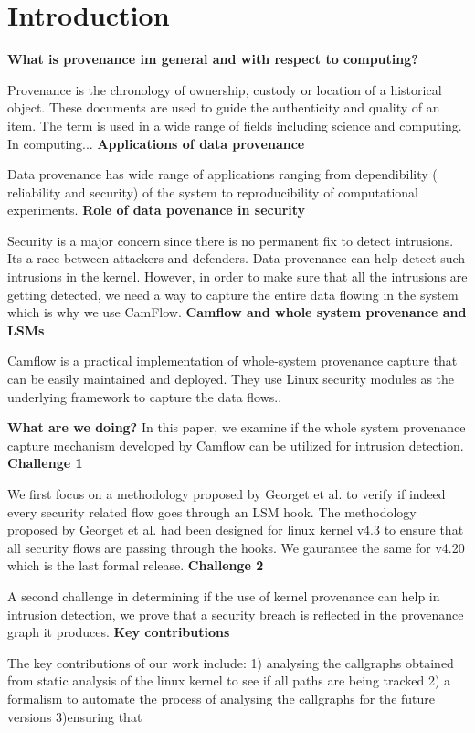 \section{Introduction}
\textbf{What is provenance im general and with respect to computing?}

Provenance is the chronology of ownership, custody or location of a historical object. These documents are used to guide the authenticity and quality of an item. The term is used in a wide range of fields including science and computing. In computing...
\vskip 0.1in
\textbf{Applications of data provenance}

Data provenance has wide range of applications ranging from dependibility ( reliability and security) of the system to reproducibility of computational experiments.
\vskip 0.1in
\textbf{Role of data povenance in security}

Security is a major concern since there is no permanent fix to detect intrusions. Its a race between attackers and defenders. Data provenance can help detect such intrusions in the kernel. However, in order to make sure that all the intrusions are getting detected, we need a way to capture the entire data flowing in the system which is why we use CamFlow. 
\vskip 0.1in
\textbf{Camflow and whole system provenance and LSMs}

Camflow is a practical implementation of whole-system provenance capture that can be easily maintained and deployed. They use Linux security modules as the underlying framework to capture the data flows.. 


\textbf{What are we doing?}
In this paper, we examine if the whole system provenance capture mechanism developed by Camflow can be utilized for intrusion detection. 
\vskip 0.1in
\textbf{Challenge 1}

We first focus on a methodology proposed by Georget et al. to verify if indeed every security related flow goes through an LSM hook. The methodology proposed by Georget et al. had been designed for linux kernel v4.3 to ensure that all security flows are passing through the hooks. We gaurantee the same for v4.20 which is the last formal release. 
\vskip 0.1in
\textbf{Challenge 2}

A second challenge in determining if the use of kernel provenance can help in intrusion detection, we prove that a security breach is reflected in the provenance graph it produces. 
\vskip 0.1in
\textbf{Key contributions}

The key contributions of our work include: 1) analysing the callgraphs obtained from static analysis of the linux kernel to see if all paths are being tracked 2) a formalism to automate the process of analysing the callgraphs for the future versions 3)ensuring that 
